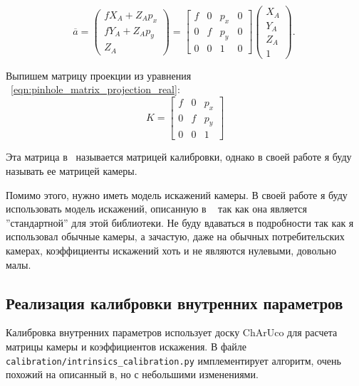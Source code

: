 \documentclass[12pt, a4paper]{article}
\begin{document}
\begin{equation}
    \overline{a} = \begin{pmatrix}
        fX_A + Z_A p_x\\
        fY_A + Z_A p_y\\
        Z_A
    \end{pmatrix} = \begin{bmatrix}
        f & 0 & p_x & 0 \\
        0 & f & p_y & 0 \\
        0 & 0 & 1 & 0
    \end{bmatrix} \begin{pmatrix}
        X_A\\
        Y_A\\
        Z_A\\
        1
    \end{pmatrix}.
~\label{eqn:pinhole_matrix_projection_real}
\end{equation}

Выпишем матрицу проекции из уравнения ~\eqref{eqn:pinhole_matrix_projection_real}:
\begin{equation}
    K = \begin{bmatrix}
        f & 0 & p_x\\
        0 & f & p_y\\
        0 & 0 & 1
    \end{bmatrix}
\end{equation}

Эта матрица в~\cite{multiview_cv} называется матрицей калибровки, однако в своей
работе я буду называть ее матрицей камеры. 

Помимо этого, нужно иметь модель искажений камеры.
В своей работе я буду использовать модель искажений, описанную в
~\cite{opencv_calibration_tutorial} так как она является ''стандартной'' для этой
библиотеки.  Не буду вдаваться в подробности так как я использовал обычные
камеры, а зачастую, даже на обычных потребительских камерах, коэффициенты
искажений хоть и не являются нулевыми, довольно малы.

\subsection{Реализация калибровки внутренних параметров}
\label{sec:camera_intrinsics_calibration}
Калибровка внутренних параметров использует доску ChArUco для расчета матрицы
камеры и коэффициентов искажения. В файле
\texttt{calibration/intrinsics\_calibration.py} имплементирует алгоритм, очень
похожий на описанный в\cite{opencv_calibration_tutorial}, но с небольшими
изменениями.
\end{document}

